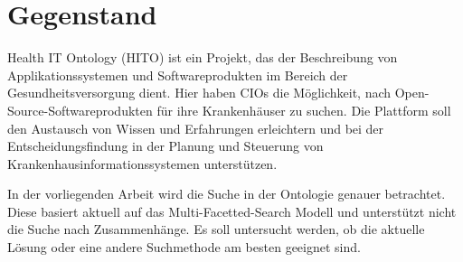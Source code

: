 \section{Gegenstand}\label{sec:gegenstand}


Health IT Ontology (HITO) ist ein Projekt, das der Beschreibung von Applikationssystemen und Softwareprodukten im Bereich der Gesundheitsversorgung dient. Hier haben CIOs die Möglichkeit, nach Open-Source-Softwareprodukten für ihre Krankenhäuser zu suchen. Die Plattform soll den Austausch von Wissen und Erfahrungen erleichtern und bei der Entscheidungsfindung in der Planung und Steuerung von Krankenhausinformationssystemen unterstützen.

In der vorliegenden Arbeit wird die Suche in der Ontologie genauer betrachtet. Diese basiert aktuell auf das Multi-Facetted-Search Modell und unterstützt nicht die Suche nach Zusammenhänge. Es soll untersucht werden, ob die aktuelle Lösung oder eine andere Suchmethode am besten geeignet sind. 




